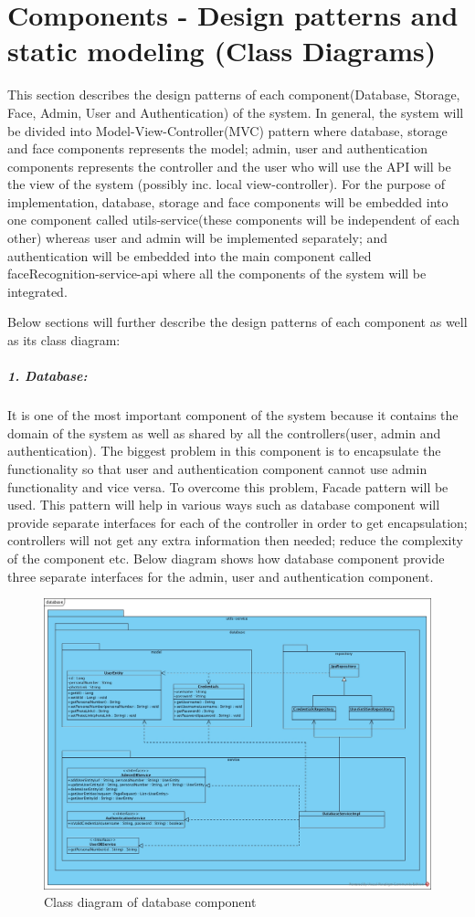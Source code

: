 \documentclass[a4paper,11pt]{article}
\begin{document}
\section{Components - Design patterns and static modeling (Class Diagrams)}
This section describes the design patterns of each component(Database, Storage, Face, Admin, User and Authentication) of the system. In general, the system will be divided into Model-View-Controller(MVC) pattern where database, storage and face components represents the model; admin, user and authentication components represents the controller and the user who will use the API will be the view of the system (possibly inc. local view-controller). For the purpose of implementation, database, storage and face components will be embedded into one component called utils-service(these components will be independent of each other) whereas user and admin will be implemented separately; and authentication will be embedded into the main component called faceRecognition-service-api where all the components of the system will be integrated.
\newline

\noindent
Below sections will further describe the design patterns of each component as well as its class diagram:

\subparagraph{1. Database: }It is one of the most important component of the system because it contains the domain of the system as well as shared by all the controllers(user, admin and authentication). The biggest problem in this component is to encapsulate the functionality so that user and authentication component cannot use admin functionality and vice versa. To overcome this problem, Facade pattern will be used. This pattern will help in various ways such as database component will provide separate interfaces for each of the controller in order to get encapsulation; controllers will not get any extra information then needed; reduce the complexity of the component etc. Below diagram shows how database component provide three separate interfaces for the admin, user and authentication component.

\begin{figure}[ht!]
    \centering
	\includegraphics[width=130mm]{ClassDiagrams/new/database.jpg}
	\caption{Class diagram of database component}
\end{figure}
\end{document}
